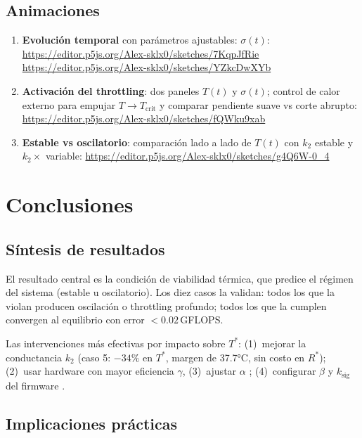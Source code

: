 \documentclass[10pt, twocolumn]{article}
\begin{document}
\subsection{Animaciones}

\begin{enumerate}\setlength\itemsep{1pt}
  \item \textbf{Evolución temporal} con parámetros ajustables:
        $\sigma(t)$: \url{https://editor.p5js.org/Alex-sklx0/sketches/7KqpJfRie}
        \url{https://editor.p5js.org/Alex-sklx0/sketches/YZkcDwXYb}
  \item \textbf{Activación del throttling}: dos paneles $T(t)$ y
        $\sigma(t)$; control de calor externo para empujar $T \to T_\text{crit}$
        y comparar pendiente suave vs corte abrupto:
        \url{https://editor.p5js.org/Alex-sklx0/sketches/fQWku9xab}
  \item \textbf{Estable vs oscilatorio}: comparación lado a lado de
        $T(t)$ con $k_2$ estable y $k_2 \times$ variable:
        \url{https://editor.p5js.org/Alex-sklx0/sketches/g4Q6W-0_4}
\end{enumerate}

\section{Conclusiones}
\label{sec:conclusiones}

\subsection{Síntesis de resultados}

El resultado central es la condición de viabilidad térmica,
que predice el régimen del sistema (estable u oscilatorio). Los diez casos la validan: todos los que la violan producen
oscilación o throttling profundo; todos los que la cumplen convergen al
equilibrio con error $<0.02$\,GFLOPS.

Las intervenciones más efectivas por impacto sobre $T^*$: (1)~mejorar
la conductancia $k_2$ (caso 5: $-34\%$ en $T^*$, margen de 37.7°C, sin
costo en $R^*$); (2)~usar hardware con mayor eficiencia $\gamma$, (3)~ajustar $\alpha$
; (4)~configurar
$\beta$ y $k_\text{sig}$ del firmware .

\subsection{Implicaciones prácticas}
\end{document}
